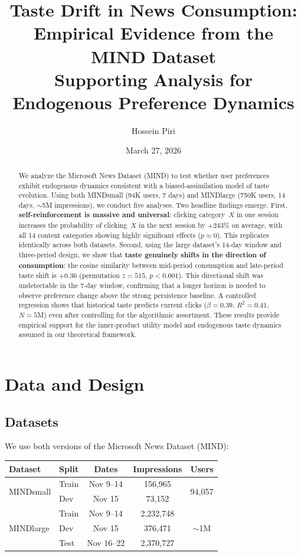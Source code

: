 \documentclass[11pt]{article}
\title{Taste Drift in News Consumption:\\[4pt] Empirical Evidence from the MIND Dataset\\[6pt]
\large Supporting Analysis for Endogenous Preference Dynamics}
\author{Hossein Piri}
\date{March 27, 2026}
\begin{document}
\maketitle

\begin{abstract}
We analyze the Microsoft News Dataset (MIND) to test whether user preferences exhibit endogenous dynamics consistent with a biased-assimilation model of taste evolution. Using both MINDsmall (94K users, 7 days) and MINDlarge (750K users, 14 days, $\sim$5M impressions), we conduct five analyses. Two headline findings emerge. First, \textbf{self-reinforcement is massive and universal}: clicking category~$X$ in one session increases the probability of clicking~$X$ in the next session by $+243\%$ on average, with all 14 content categories showing highly significant effects ($p \approx 0$). This replicates identically across both datasets. Second, using the large dataset's 14-day window and three-period design, we show that \textbf{taste genuinely shifts in the direction of consumption}: the cosine similarity between mid-period consumption and late-period taste shift is $+0.36$ (permutation $z = 515$, $p < 0.001$). This directional shift was undetectable in the 7-day window, confirming that a longer horizon is needed to observe preference change above the strong persistence baseline. A controlled regression shows that historical taste predicts current clicks ($\beta = 0.39$, $R^2 = 0.41$, $N = 5$M) even after controlling for the algorithmic assortment. These results provide empirical support for the inner-product utility model and endogenous taste dynamics assumed in our theoretical framework.
\end{abstract}

\section{Data and Design}

\subsection{Datasets}

We use both versions of the Microsoft News Dataset (MIND):

\begin{center}
\begin{tabular}{llccc}
\toprule
Dataset & Split & Dates & Impressions & Users \\
\midrule
\multirow{2}{*}{MINDsmall} & Train & Nov 9--14 & 156,965 & \multirow{2}{*}{94,057} \\
 & Dev & Nov 15 & 73,152 & \\
\midrule
\multirow{3}{*}{MINDlarge} & Train & Nov 9--14 & 2,232,748 & \multirow{3}{*}{$\sim$1M} \\
 & Dev & Nov 15 & 376,471 & \\
 & Test & Nov 16--22 & 2,370,727 & \\
\bottomrule
\end{tabular}
\end{center}
\end{document}
